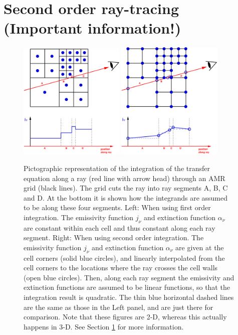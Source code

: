 \documentclass{report}
\begin{document}
\section{Second order ray-tracing (Important information!)}
\label{sec-second-order}
%
\begin{figure}
\centerline{\includegraphics[width=0.45\textwidth]{cellcenter.eps}
  \hspace{3em}\includegraphics[width=0.45\textwidth]{cellcorner.eps}}
\caption{\label{fig-cellcenter-cellcorner}
%
  Pictographic representation of the integration of the transfer equation
  along a ray (red line with arrow head) through an AMR grid (black lines).
  The grid cuts the ray into ray segments A, B, C and D. At the bottom
  it is shown how the integrands are assumed to
  be along these four segments. Left: When using
  first order integration. The emissivity function $j_\nu$ and extinction
  function $\alpha_\nu$ are constant within each cell and thus constant
  along each
  ray segment. Right: When using second order integration. The emissivity 
  function $j_\nu$ and extinction
  function $\alpha_\nu$ are given at the cell corners (solid blue circles),
  and linearly interpolated from the cell corners
  to the locations where the ray crosses the cell walls (open blue circles).
  Then, along each ray segment the emissivity and extinction functions
  are assumed to be linear functions, so that the integration result is
  quadratic. The thin blue horizontal dashed lines are the same as those
  in the Left panel, and are just there for comparison. Note that these
  figures are 2-D, whereas this actually happens in 3-D. See Section
  \ref{sec-second-order} for more information.
%
}
\end{figure}
\end{document}
